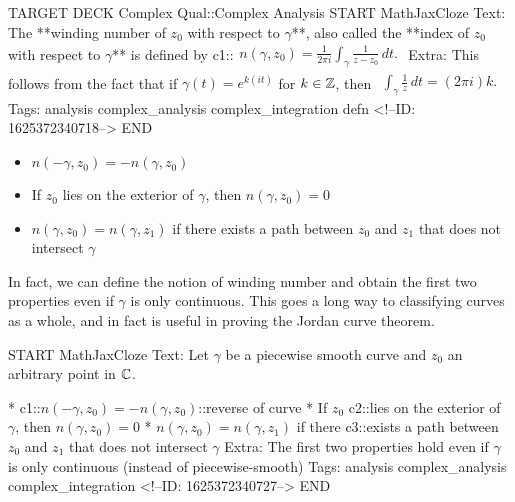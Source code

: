 \documentclass{memoir}
\begin{document}
\begin{anki}
TARGET DECK
Complex Qual::Complex Analysis
START
MathJaxCloze
Text: The **winding number of \(z_0\) with respect to \(\gamma \)**, also called the **index of \(z_0\) with respect to \(\gamma \)** is defined by
 {{c1::\(\begin{align*}
         	n(\gamma ,z_0) = \frac{1}{2\pi i} \int_\gamma \frac{1}{z-z_0}\,d t.
         \end{align*}\)}}
Extra: This follows from the fact that if \(\gamma(t) = e^{k(it)}\) for \(k \in \mathbb{Z}\), then
\(\begin{align*}
  	\int_\gamma \frac{1}{z}\,d t = (2\pi i)k.
  \end{align*}\)
Tags: analysis complex_analysis complex_integration defn
<!--ID: 1625372340718-->
END
\end{anki}


\begin{prop}
	\begin{itemize}
		\item \(n(-\gamma ,z_0) = -n(\gamma,z_0)\) 
		\item If \(z_0\) lies on the exterior of \(\gamma \), then \(n(\gamma ,z_0) = 0\)
		\item \(n(\gamma ,z_0)=n(\gamma ,z_1)\) if there exists a path between \(z_0\) and \(z_1\) that does not intersect \(\gamma \) 
	\end{itemize}
\end{prop}

In fact, we can define the notion of winding number and obtain the first two properties even if \(\gamma \) is only continuous. This goes a long way to classifying curves as a whole, and in fact is useful in proving the Jordan curve theorem.

\begin{anki}
START
MathJaxCloze
Text: Let \(\gamma \) be a piecewise smooth curve and \(z_0\) an arbitrary point in \(\mathbb{C}\).

* {{c1::\(n(-\gamma ,z_0) = -n(\gamma,z_0)\)::reverse of curve}}  
* If \(z_0\) {{c2::lies on the exterior of \(\gamma \)}}, then \(n(\gamma ,z_0) = 0\)
* \(n(\gamma ,z_0)=n(\gamma ,z_1)\) if there {{c3::exists a path between \(z_0\) and \(z_1\) that does not intersect \(\gamma \)}} 
Extra: The first two properties hold even if \(\gamma \) is only continuous (instead of piecewise-smooth)
Tags: analysis complex_analysis complex_integration
<!--ID: 1625372340727-->
END
\end{anki}
\end{document}
